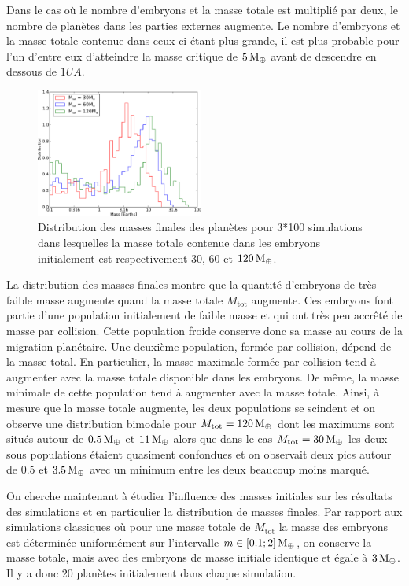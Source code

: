 Dans le cas où le nombre d'embryons et la masse totale est multiplié par deux, le nombre de planètes dans les parties externes augmente. Le nombre d'embryons et la masse totale contenue dans ceux-ci étant plus grande, il est plus probable pour l'un d'entre eux d'atteindre la masse critique de $5\mathrm{\thinspace M_\oplus}$ avant de descendre en dessous de $1\unit{UA}$. 

\begin{figure}[htbp]
\centering
\includegraphics[width=0.49\textwidth]{figure/HSE/m_tot_hist_m.pdf}

\caption{Distribution des masses finales des planètes pour 3*100 simulations dans lesquelles la masse totale contenue dans les embryons initialement est respectivement $30$, $60$ et $120\mathrm{\thinspace M_\oplus}$.}\label{fig:HSE_m_tot_hist_m}
\end{figure}

La distribution des masses finales  montre que la quantité d'embryons de très faible masse augmente quand la masse totale $M_\text{tot}$ augmente. Ces embryons font partie d'une population initialement de faible masse et qui ont très peu accrêté de masse par collision. Cette population froide conserve donc sa masse au cours de la migration planétaire. Une deuxième population, formée par collision, dépend de la masse total. En particulier, la masse maximale formée par collision tend à augmenter avec la masse totale disponible dans les embryons. De même, la masse minimale de cette population tend à augmenter avec la masse totale. Ainsi, à mesure que la masse totale augmente, les deux populations se scindent et on observe une distribution bimodale pour $M_\text{tot}=120\mathrm{\thinspace M_\oplus}$ dont les maximums sont situés autour de $0.5\mathrm{\thinspace M_\oplus}$ et $11\mathrm{\thinspace M_\oplus}$ alors que dans le cas $M_\text{tot}=30\mathrm{\thinspace M_\oplus}$ les deux sous populations étaient quasiment confondues et on observait deux pics autour de $0.
5$ et $3.5\mathrm{\thinspace M_\oplus}$ avec un minimum entre les deux beaucoup moins marqué.

\bigskip

On cherche maintenant à étudier l'influence des masses initiales sur les résultats des simulations et en particulier la distribution de masses finales. Par rapport aux simulations classiques où pour une masse totale de $M_\text{tot}$ la masse des embryons est déterminée uniformément sur l'intervalle $m\in[0.1 ; 2]\mathrm{\thinspace M_\oplus}$, on conserve la masse totale, mais avec des embryons de masse initiale identique et égale à $3\mathrm{\thinspace M_\oplus}$. Il y a donc 20 planètes initialement dans chaque simulation. 

